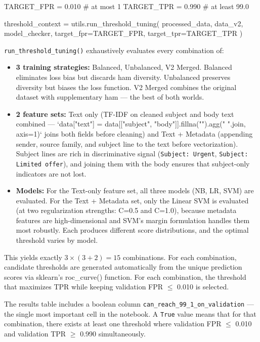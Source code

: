 \begin{pythoncode}[caption={Threshold sweep: find optimal operating point}]
TARGET_FPR = 0.010   # at most 1%
TARGET_TPR = 0.990   # at least 99.0%

threshold_context = utils.run_threshold_tuning(
    processed_data, data_v2, model_checker,
    target_fpr=TARGET_FPR, target_tpr=TARGET_TPR
)
\end{pythoncode}

\texttt{run\_threshold\_tuning()} exhaustively evaluates every combination of:

\begin{itemize}
  \item \textbf{3 training strategies:} Balanced, Unbalanced, V2 Merged. Balanced eliminates loss bias but discards ham diversity. Unbalanced preserves diversity but biases the loss function. V2 Merged combines the original dataset with supplementary ham — the best of both worlds.
  \item \textbf{2 feature sets:} Text only (TF-IDF on cleaned subject and body text combined — `data["text"] = data[["subject", "body"]].fillna("").agg(" ".join, axis=1)` joins both fields before cleaning) and Text + Metadata (appending sender, source family, and subject line to the text before vectorization). Subject lines are rich in discriminative signal (\texttt{Subject: Urgent}, \texttt{Subject: Limited offer}), and joining them with the body ensures that subject-only indicators are not lost.
  \item \textbf{Models:} For the Text-only feature set, all three models (NB, LR, SVM) are evaluated. For the Text + Metadata set, only the Linear SVM is evaluated (at two regularization strengths: C=0.5 and C=1.0), because metadata features are high-dimensional and SVM's margin formulation handles them most robustly. Each produces different score distributions, and the optimal threshold varies by model.
\end{itemize}

This yields exactly $3 \times (3 + 2) = 15$ combinations. For each combination, candidate thresholds are generated automatically from the unique prediction scores via sklearn's roc_curve() function. For each combination, the threshold that maximizes TPR while keeping validation FPR $\le$ 0.010 is selected.

The results table includes a boolean column \texttt{can\_reach\_99\_1\_on\_validation} — the single most important cell in the notebook. A \texttt{True} value means that for that combination, there exists at least one threshold where validation FPR $\le$ 0.010 and validation TPR $\ge$ 0.990 simultaneously.

